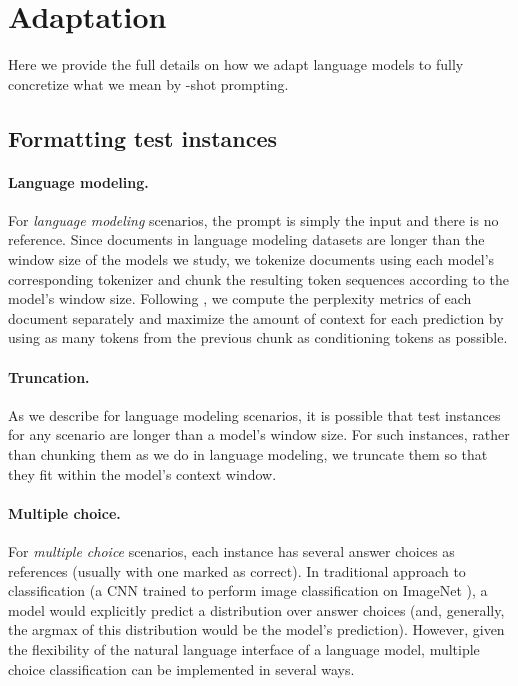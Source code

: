 \section{Adaptation}
\label{app:adaptation}

Here we provide the full details on how we adapt language models to fully concretize what we mean by \numincontext-shot prompting. 

\subsection{Formatting test instances}
\label{sec:prompting-test}

\paragraph{Language modeling.}
For \emph{language modeling} scenarios,
the prompt is simply the input and there is no reference.
Since documents in language modeling datasets are longer than the window size of the models we study, we tokenize documents using each model's corresponding tokenizer and chunk the resulting token sequences according to the model's window size. Following \citet{gao2021thepile}, we compute the perplexity metrics of each document separately and maximize the amount of context for each prediction by using as many tokens from the previous chunk as conditioning tokens as possible.

\paragraph{Truncation.}
As we describe for language modeling scenarios, it is possible that test instances for any scenario are longer than a model's window size.
For such instances, rather than chunking them as we do in language modeling, we truncate them so that they fit within the model's context window.

\paragraph{Multiple choice.}
For \textit{multiple choice} scenarios, each instance has several answer choices as references (usually with one marked as correct).
In traditional approach to classification (\eg a CNN trained to perform image classification on ImageNet \citep{deng2009imagenet}), a model would explicitly predict a distribution over answer choices (and, generally, the argmax of this distribution would be the model's prediction).
However, given the flexibility of the natural language interface of a language model, multiple choice classification can be implemented in several ways.

